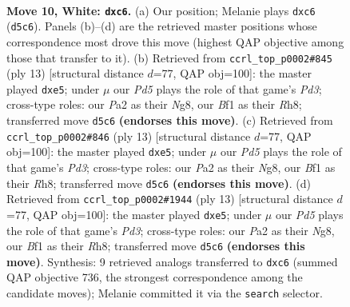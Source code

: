 \documentclass[11pt]{article}
\begin{document}
\clearpage

\begin{figure}[p]\centering
\begin{subfigure}{0.46\textwidth}\centering
\resizebox{\linewidth}{!}{%
\newchessgame
\chessboard[
  setfen={rn1qkbnr/p5p1/2p3bp/1p1Ppp2/2P4P/6NR/PP3PP1/R1BQKBN1 w Qkq - 0 10},
  showmover=false,
  pgfstyle=straightmove, color=movearrow, markmove={d5-c6}
]}
\caption{}
\end{subfigure}\hfill
\begin{subfigure}{0.46\textwidth}\centering
\resizebox{\linewidth}{!}{%
\newchessgame
\chessboard[
  setfen={r1bqk1nr/ppp3bp/2np2p1/4Pp2/2P5/2N1P1P1/PP3PBP/R1BQK1NR b KQkq - 0 7},
  showmover=false,
  pgfstyle=straightmove, color=movearrow, markmove={d6-e5}
]}
\caption{}
\end{subfigure}
\\[4pt]
\begin{subfigure}{0.46\textwidth}\centering
\resizebox{\linewidth}{!}{%
\newchessgame
\chessboard[
  setfen={r1bqk1nr/ppp3bp/2np2p1/4Pp2/2P5/2N1P1P1/PP3PBP/R1BQK1NR b KQkq - 0 7},
  showmover=false,
  pgfstyle=straightmove, color=movearrow, markmove={d6-e5}
]}
\caption{}
\end{subfigure}\hfill
\begin{subfigure}{0.46\textwidth}\centering
\resizebox{\linewidth}{!}{%
\newchessgame
\chessboard[
  setfen={r1bqk1nr/ppp3bp/2np2p1/4Pp2/2P5/2N1P1P1/PP3PBP/R1BQK1NR b KQkq - 0 7},
  showmover=false,
  pgfstyle=straightmove, color=movearrow, markmove={d6-e5}
]}
\caption{}
\end{subfigure}
\caption{\textbf{Move 10, White: \texttt{dxc6}.} (a) Our position; Melanie plays \texttt{dxc6} (\texttt{d5c6}). Panels (b)--(d) are the retrieved master positions whose correspondence most drove this move (highest QAP objective among those that transfer to it). (b) Retrieved from \texttt{ccrl\_top\_p0002\#845} (ply 13) [structural distance $d$=77, QAP obj=100]: the master played \texttt{dxe5}; under $\mu$ our \emph{Pd5} plays the role of that game's \emph{Pd3}; cross-type roles: our \emph{P}a2 as their \emph{N}g8, our \emph{B}f1 as their \emph{R}h8; transferred move \texttt{d5c6} \textbf{(endorses this move)}. (c) Retrieved from \texttt{ccrl\_top\_p0002\#846} (ply 13) [structural distance $d$=77, QAP obj=100]: the master played \texttt{dxe5}; under $\mu$ our \emph{Pd5} plays the role of that game's \emph{Pd3}; cross-type roles: our \emph{P}a2 as their \emph{N}g8, our \emph{B}f1 as their \emph{R}h8; transferred move \texttt{d5c6} \textbf{(endorses this move)}. (d) Retrieved from \texttt{ccrl\_top\_p0002\#1944} (ply 13) [structural distance $d$=77, QAP obj=100]: the master played \texttt{dxe5}; under $\mu$ our \emph{Pd5} plays the role of that game's \emph{Pd3}; cross-type roles: our \emph{P}a2 as their \emph{N}g8, our \emph{B}f1 as their \emph{R}h8; transferred move \texttt{d5c6} \textbf{(endorses this move)}. Synthesis: 9 retrieved analogs transferred to \texttt{dxc6} (summed QAP objective 736, the strongest correspondence among the candidate moves); Melanie committed it via the \texttt{search} selector.}
\label{fig:thought-m18}
\end{figure}
\end{document}
